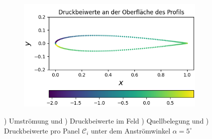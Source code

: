 \begin{figure}[!ht]
\begin{subfigure}[b]{0.475\linewidth}
    \caption{\label{fig:nacaq}}
  \end{subfigure}
  \hfill
  \begin{subfigure}[b]{0.475\linewidth}
    \centering\includegraphics[scale=0.5]{figures/naca0012cp.png} 
    \caption{\label{fig:nacacp}}
  \end{subfigure}
  
  \caption{) Umströmung und ) Druckbeiwerte im Feld ) Quellbelegung und ) Druckbeiwerte pro Panel $\mathcal{C}_{i}$ unter dem Anströmwinkel $\alpha =5^{\circ}$}
\end{figure}

\newpage
